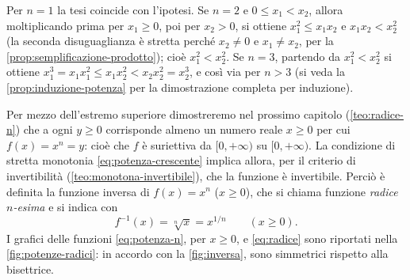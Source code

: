 \begin{dimostrazione}
Per $n=1$ la tesi coincide con l'ipotesi. Se $n=2$ e $0\le x_{1}<x_{2}$, allora
moltiplicando prima per $x_{1}\ge0$, poi per $x_{2}>0$, si ottiene
$x_{1}^{2}\le x_{1}x_{2}$ e $x_{1}x_{2}<x_{2}^{2}$ (la seconda disuguaglianza è stretta
perché $x_{2}\neq0$ e $x_{1}\neq x_{2}$, per la \cref{prop:semplificazione-prodotto});
cioè $x_{1}^{2}<x_{2}^{2}$.
Se $n=3$, partendo da $x_{1}^{2}<x_{2}^{2}$ si ottiene
$x_{1}^{3}=x_{1}x_{1}^{2}\le x_{1}x_{2}^{2}<x_{2}x_{2}^{2}=x_{2}^{3}$, e così via per
$n>3$ (si veda la \cref{prop:induzione-potenza} per la dimostrazione completa per
induzione).
\end{dimostrazione}

Per mezzo dell'estremo superiore dimostreremo nel prossimo capitolo
(\cref{teo:radice-n}) che a ogni $y\ge0$ corrisponde almeno un numero reale $x\ge0$ per cui
$f(x)=x^{n}=y$: cioè che $f$ è suriettiva da $[0,+\infty)$ su $[0,+\infty)$. La
condizione di stretta monotonia \eqref{eq:potenza-crescente} implica allora, per il
criterio di invertibilità (\cref{teo:monotona-invertibile}), che la funzione è
invertibile. Perciò è definita la funzione inversa di $f(x)=x^{n}$ ($x\ge0$), che si
chiama funzione \emph{radice $n$-esima} e si indica con
\begin{equation}\label{eq:radice}
  f^{-1}(x)=\sqrt[n]{x}=x^{1/n} \qquad (x\ge0).
\end{equation}
I grafici delle funzioni \eqref{eq:potenza-n}, per $x\ge0$, e \eqref{eq:radice} sono
riportati nella \cref{fig:potenze-radici}: in accordo con la \cref{fig:inversa}, sono
simmetrici rispetto alla bisettrice.

